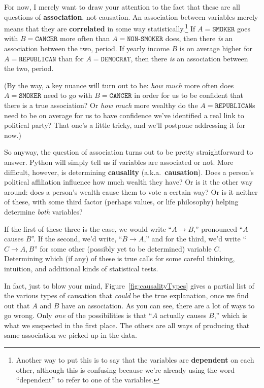 
For now, I merely want to draw your attention to the fact that these are all
questions of \textbf{association}, not causation. An association between
variables merely means that they are \textbf{correlated} in some way
statistically.\footnote{Another way to put this is to say that the variables
are \textbf{dependent} on each other, although this is confusing because we're
already using the word ``dependent'' to refer to one of the variables.} If
$A=\texttt{SMOKER}$ goes with $B=\texttt{CANCER}$ more often than
$A=\texttt{NON-SMOKER}$ does, then there \textit{is} an association between the
two, period. If yearly income $B$ is on average higher for
$A=\texttt{REPUBLICAN}$ than for $A=\texttt{DEMOCRAT}$, then there \textit{is}
an association between the two, period.

(By the way, a key nuance will turn out to be: \textit{how much} more often
does $A=\texttt{SMOKER}$ need to go with $B=\texttt{CANCER}$ in order for us to
be confident that there is a true association? Or \textit{how much} more
wealthy do the $A=\texttt{REPUBLICAN}$s need to be on average for us to have
confidence we've identified a real link to political party? That one's a little
tricky, and we'll postpone addressing it for now.)


So anyway, the question of association turns out to be pretty straightforward
to answer. Python will simply tell us if variables are associated or not. More
difficult, however, is determining \textbf{causality}
(a.k.a.~\textbf{causation}). Does a person's political affiliation influence
how much wealth they have? Or is it the other way around: does a person's
wealth cause them to vote a certain way? Or is it neither of these, with some
third factor (perhaps values, or life philosophy) helping determine
\textit{both} variables?


If the first of these three is the case, we would write ``$A \rightarrow B$,''
pronounced ``$A$ causes $B$''. If the second, we'd write, ``$B \rightarrow
A$,'' and for the third, we'd write ``$C \rightarrow A, B$'' for some other
(possibly yet to be determined) variable $C$. Determining which (if any) of
these is true calls for some careful thinking, intuition, and additional kinds
of statistical tests.

In fact, just to blow your mind, Figure~\ref{fig:causalityTypes} gives a
partial list of the various types of causation that \textit{could} be the true
explanation, once we find out that $A$ and $B$ have an association. As you can
see, there are a lot of ways to go wrong. Only \textit{one} of the
possibilities is that ``$A$ actually causes $B$,'' which is what we suspected
in the first place. The others are all ways of producing that same association
we picked up in the data.

